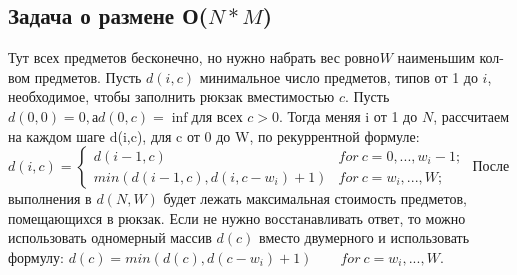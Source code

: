 \subsection{Задача о размене О($N*M$)}
Тут всех предметов бесконечно, но нужно набрать вес ровно$ W$ наименьшим кол-вом предметов.\newline
Пусть $d(i,c)$ минимальное число предметов, типов от 1 до $i$, необходимое, чтобы заполнить рюкзак вместимостью $c$.
Пусть $d(0,0) = 0, а d(0,c) = \inf $для всех $c > 0$.
Тогда меняя i от 1 до $N$, рассчитаем на каждом шаге d(i,c), для c от 0 до W, по рекуррентной формуле:\newline
$d(i,c) = \begin{cases}  d(i - 1, c) & for\ c = 0, ..., w_i - 1; \\  min(d(i - 1, c), d(i, c - w_i) + 1) & for\ c = w_i, ..., W;  \end{cases}$\newline
После выполнения в $d(N,W)$ будет лежать максимальная стоимость предметов, помещающихся в рюкзак.
Если не нужно восстанавливать ответ, то можно использовать одномерный массив $d(c)$ вместо двумерного и использовать формулу:
$d(c) = min(d(c), d(c - w_i) + 1) \qquad  for\ c = w_i, ..., W$.\newline
